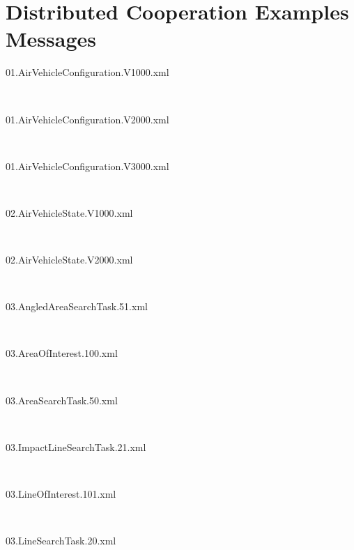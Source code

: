 \chapter{Distributed Cooperation Examples Messages}
\begin{fullwidth}
	
\begin{description}

		\item[\hypertarget{msg:01.AirVehicleConfiguration.V1000.xml}{01.AirVehicleConfiguration.V1000.xml}]  \hfill \ 
        \item[\hypertarget{msg:01.AirVehicleConfiguration.V2000.xml}{01.AirVehicleConfiguration.V2000.xml}]  \hfill \ 
        \item[\hypertarget{msg:01.AirVehicleConfiguration.V3000.xml}{01.AirVehicleConfiguration.V3000.xml}]  \hfill \ 
        \item[\hypertarget{msg:02.AirVehicleState.V1000.xml}{02.AirVehicleState.V1000.xml}]  \hfill \ 
        \item[\hypertarget{msg:02.AirVehicleState.V2000.xml}{02.AirVehicleState.V2000.xml}]  \hfill \ 
        \item[\hypertarget{msg:03.AngledAreaSearchTask.51.xml}{03.AngledAreaSearchTask.51.xml}]  \hfill \ 
        \item[\hypertarget{msg:03.AreaOfInterest.100.xml}{03.AreaOfInterest.100.xml}]  \hfill \ 
        \item[\hypertarget{msg:03.AreaSearchTask.50.xml}{03.AreaSearchTask.50.xml}]  \hfill \ 
        \item[\hypertarget{msg:03.ImpactLineSearchTask.21.xml}{03.ImpactLineSearchTask.21.xml}]  \hfill \ 
        \item[\hypertarget{msg:03.LineOfInterest.101.xml}{03.LineOfInterest.101.xml}]  \hfill \ 
        \item[\hypertarget{msg:03.LineSearchTask.20.xml}{03.LineSearchTask.20.xml}]  \hfill \ 

\end{description}
\end{fullwidth}
